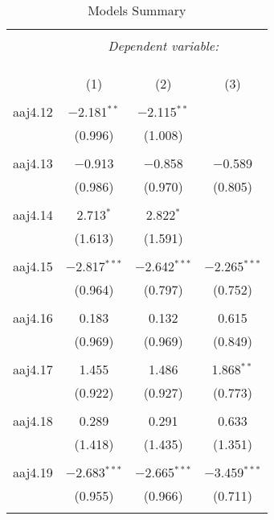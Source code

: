 
\begin{table}[!htbp] \centering 
  \caption{Models Summary} 
  \label{} 
\begin{tabular}{@{\extracolsep{5pt}}lccc} 
\\[-1.8ex]\hline 
\hline \\[-1.8ex] 
 & \multicolumn{3}{c}{\textit{Dependent variable:}} \\ 
\cline{2-4} 
\\[-1.8ex] & \multicolumn{3}{c}{ } \\ 
\\[-1.8ex] & (1) & (2) & (3)\\ 
\hline \\[-1.8ex] 
 aaj4.12 & $-$2.181$^{**}$ & $-$2.115$^{**}$ &  \\ 
  & (0.996) & (1.008) &  \\ 
  & & & \\ 
 aaj4.13 & $-$0.913 & $-$0.858 & $-$0.589 \\ 
  & (0.986) & (0.970) & (0.805) \\ 
  & & & \\ 
 aaj4.14 & 2.713$^{*}$ & 2.822$^{*}$ &  \\ 
  & (1.613) & (1.591) &  \\ 
  & & & \\ 
 aaj4.15 & $-$2.817$^{***}$ & $-$2.642$^{***}$ & $-$2.265$^{***}$ \\ 
  & (0.964) & (0.797) & (0.752) \\ 
  & & & \\ 
 aaj4.16 & 0.183 & 0.132 & 0.615 \\ 
  & (0.969) & (0.969) & (0.849) \\ 
  & & & \\ 
 aaj4.17 & 1.455 & 1.486 & 1.868$^{**}$ \\ 
  & (0.922) & (0.927) & (0.773) \\ 
  & & & \\ 
 aaj4.18 & 0.289 & 0.291 & 0.633 \\ 
  & (1.418) & (1.435) & (1.351) \\ 
  & & & \\ 
 aaj4.19 & $-$2.683$^{***}$ & $-$2.665$^{***}$ & $-$3.459$^{***}$ \\ 
  & (0.955) & (0.966) & (0.711) \\ 
  & & & \\ 

\end{tabular}
\end{table}
